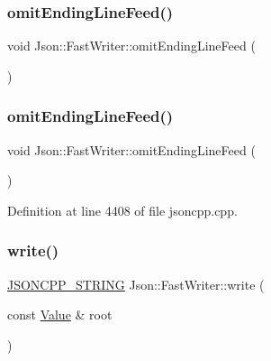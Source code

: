 \hypertarget{class_json_1_1_fast_writer_af4ee077d365d75941fb2688d97207a55}{}\label{class_json_1_1_fast_writer_af4ee077d365d75941fb2688d97207a55} 
\subsubsection{\texorpdfstring{omit\+Ending\+Line\+Feed()}{omitEndingLineFeed()}\hspace{0.1cm}{\footnotesize\ttfamily [1/2]}}
{\footnotesize\ttfamily void Json\+::\+Fast\+Writer\+::omit\+Ending\+Line\+Feed (\begin{DoxyParamCaption}{ }\end{DoxyParamCaption})}

\hypertarget{class_json_1_1_fast_writer_af4ee077d365d75941fb2688d97207a55}{}\label{class_json_1_1_fast_writer_af4ee077d365d75941fb2688d97207a55} 
\subsubsection{\texorpdfstring{omit\+Ending\+Line\+Feed()}{omitEndingLineFeed()}\hspace{0.1cm}{\footnotesize\ttfamily [2/2]}}
{\footnotesize\ttfamily void Json\+::\+Fast\+Writer\+::omit\+Ending\+Line\+Feed (\begin{DoxyParamCaption}{ }\end{DoxyParamCaption})}



Definition at line 4408 of file jsoncpp.\+cpp.

\hypertarget{class_json_1_1_fast_writer_a93d45ba4bc312371d08beb3e3dfbe654}{}\label{class_json_1_1_fast_writer_a93d45ba4bc312371d08beb3e3dfbe654} 
\subsubsection{\texorpdfstring{write()}{write()}\hspace{0.1cm}{\footnotesize\ttfamily [1/2]}}
{\footnotesize\ttfamily \hyperlink{config_8h_a1e723f95759de062585bc4a8fd3fa4be}{J\+S\+O\+N\+C\+P\+P\+\_\+\+S\+T\+R\+I\+NG} Json\+::\+Fast\+Writer\+::write (\begin{DoxyParamCaption}\item[{const \hyperlink{class_json_1_1_value}{Value} \&}]{root }\end{DoxyParamCaption})\hspace{0.3cm}{\ttfamily [virtual]}}




